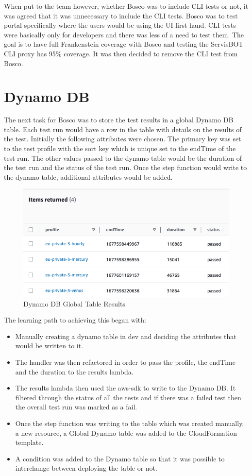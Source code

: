 \documentclass[12pt,a4paper,titlepage]{report}
\begin{document}
When put to the team however, whether Bosco was to include CLI tests or not, it was agreed that it was unnecessary to include the CLI tests. Bosco was to test portal specifically where the users would 
be using the UI first hand. CLI tests were basically only for developers and there was less of a need to test them. The goal is to have full Frankenstein coverage with Bosco and testing the ServisBOT CLI proxy has 95\% coverage. 
It was then decided to remove the CLI test from Bosco. 

\section{Dynamo DB}
The next task for Bosco was to store the test results in a global Dynamo DB table. 
Each test run would have a row in the table with details on the results of the test. 
Initially the following attributes were chosen. The primary key was set to the test profile with the sort key which is unique set to the endTime of the test run. 
The other values passed to the dynamo table would be the duration of the test run and the status of the test run. Once the step function would write to the dynamo table, additional attributes would be added.

\begin{figure}[ht]
  \centering
  \includegraphics[width=15cm]{./diagrams/dynamodb.png}
  \caption{Dynamo DB Global Table Results}
 \end{figure}

The learning path to achieving this began with:
\begin{itemize}
\item Manually creating a dynamo table in dev and deciding the attributes that would be written to it.
\item The handler was then refactored in order to pass the profile, the endTime and the duration to the results lambda.
\item The results lambda then used the aws-sdk to write to the Dynamo DB. It filtered through the status of all the tests and if there was a failed test then the overall test run was marked as a fail.
\item Once the step function was writing to the table which was created manually, a new resource, a Global Dynamo table was added to the  CloudFormation template.
\item A condition was added to the Dynamo table so that it was possible to interchange between deploying the table or not.
\end{itemize}
\end{document}
